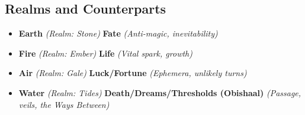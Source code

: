 \subsection*{Realms and Counterparts}\label{subsec:realms-counterparts}
\begin{itemize}
\item \textbf{Earth} \emph{(Realm: Stone)} \leftrightarrow \textbf{Fate} \emph{(Anti-magic, inevitability)}
\item \textbf{Fire} \emph{(Realm: Ember)} \leftrightarrow \textbf{Life} \emph{(Vital spark, growth)}
\item \textbf{Air} \emph{(Realm: Gale)} \leftrightarrow \textbf{Luck/Fortune} \emph{(Ephemera, unlikely turns)}
\item \textbf{Water} \emph{(Realm: Tides)} \leftrightarrow \textbf{Death/Dreams/Thresholds (Obishaal)} \emph{(Passage, veils, the Ways Between)}
\end{itemize}

\vspace{0.5em}

